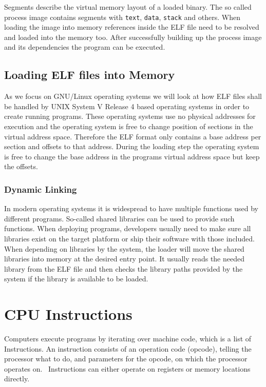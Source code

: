 Segments describe the virtual memory layout of a loaded binary. The so called 
process image contains segments with \texttt{text}, \texttt{data}, 
\texttt{stack} and others. When loading the image into memory references inside 
the ELF file need to be resolved and loaded into the memory too. After 
successfully building up the process image and its dependencies the program can 
be executed.

\subsection{Loading ELF files into Memory}

As we focus on GNU/Linux operating systems we will look at how ELF files shall 
be handled by UNIX System V Release 4 based operating systems in order to 
create running programs.
These operating systems use no physical addresses for execution and the 
operating system is free to change position of sections in the virtual address 
space. Therefore the ELF format only contains a base address per section and 
offsets to that address. During the loading step the operating system is free 
to change the base address in the programs virtual address space but keep the 
offsets.

\subsubsection{Dynamic Linking}

In modern operating systems it is widespread to have multiple functions used by
different programs. So-called shared libraries can be used to provide such
functions. When deploying programs, developers usually need to make sure all
libraries exist on the target platform or ship their software with those
included. When depending on libraries by the system, the loader will move the
shared libraries into memory at the desired entry point. It usually reads the
needed library from the ELF file and then checks the library paths provided by
the system if the library is available to be loaded.

\section{CPU Instructions}

Computers execute programs by iterating over machine code, which is a list of
Instructions. An instruction consists of an operation code (opcode), telling the
processor what to do, and parameters for the opcode, on which the processor
operates on.~ Instructions can either
operate on registers or memory locations directly.

